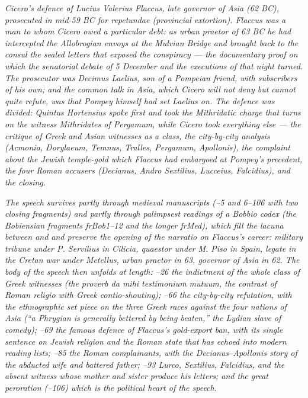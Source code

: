
\textit{Cicero's defence of Lucius Valerius Flaccus, late
governor of Asia (62 BC), prosecuted in mid-59 BC for
\textit{repetundae} (provincial extortion). Flaccus was a man
to whom Cicero owed a particular debt: as urban praetor of 63
BC he had intercepted the Allobrogian envoys at the Mulvian
Bridge and brought back to the consul the sealed letters
that exposed the conspiracy --- the documentary proof on
which the senatorial debate of 5 December and the executions
of that night turned. The prosecutor was Decimus Laelius, son
of a Pompeian friend, with subscribers of his own; and the
common talk in Asia, which Cicero will not deny but cannot
quite refute, was that Pompey himself had set Laelius on. The
defence was divided: Quintus Hortensius spoke first and took
the Mithridatic charge that turns on the witness Mithridates
of Pergamum, while Cicero took everything else --- the
critique of Greek and Asian witnesses as a class, the
city-by-city analysis (Acmonia, Dorylaeum, Temnus, Tralles,
Pergamum, Apollonis), the complaint about the Jewish
temple-gold which Flaccus had embargoed at Pompey's
precedent, the four Roman accusers (Decianus, Andro
Sextilius, Lucceius, Falcidius), and the closing.}

\textit{The speech survives partly through medieval
manuscripts (--5 and 6--106 with two closing
fragments) and partly through palimpsest readings of a
Bobbio codex (the Bobiensian fragments \textit{frBob1--12} and
the longer \textit{frMed}), which fill the lacuna between
 and  and preserve the opening of
the \textit{narratio} on Flaccus's career: military tribune
under P. Servilius in Cilicia, quaestor under M. Piso in
Spain, legate in the Cretan war under Metellus, urban praetor
in 63, governor of Asia in 62. The body of the speech then
unfolds at length: --26 the indictment of the
whole class of Greek witnesses (the proverb \textit{da mihi
testimonium mutuum}, the contrast of Roman \textit{religio}
with Greek \textit{contio}-shouting); --66
the city-by-city refutation, with the ethnographic set piece
on the three Greek races against the four nations of Asia
(``a Phrygian is generally bettered by being beaten,'' the
Lydian slave of comedy); --69 the famous
defence of Flaccus's gold-export ban, with its single
sentence on Jewish religion and the Roman state that has
echoed into modern reading lists; --85 the
Roman complainants, with the Decianus--Apollonis story of the
abducted wife and battered father; --93
Lurco, Sextilius, Falcidius, and the absent witness whose
mother and sister produce his letters; and the great
peroration (--106) which is the political heart
of the speech.}

